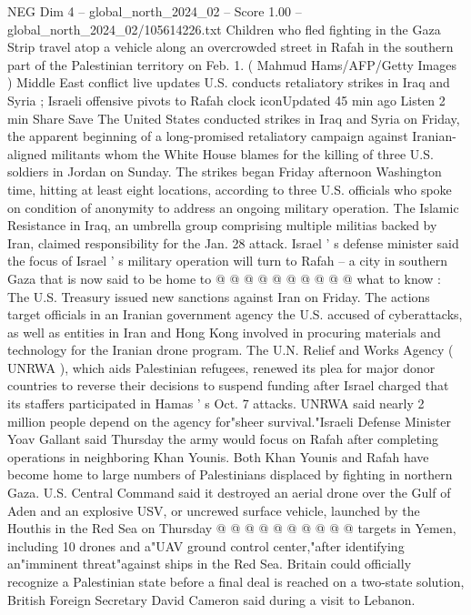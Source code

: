 \begin{textsample}{NEG Dim 4 – global\_north\_2024\_02 – Score 1.00 – global\_north\_2024\_02/105614226.txt}  \label{ex:f4_neg_290}
Children who fled fighting in the Gaza Strip travel atop a vehicle along an overcrowded street in Rafah in the southern part of the Palestinian territory on Feb. 1. ( Mahmud Hams/AFP/Getty Images ) Middle East conflict live updates U.S. conducts retaliatory strikes in Iraq and Syria ; Israeli offensive pivots to Rafah clock iconUpdated 45 min ago Listen 2 min Share Save The United States conducted strikes in Iraq and Syria on Friday, the apparent beginning of a long-promised retaliatory campaign against Iranian-aligned militants whom the White House blames for the killing of three U.S. soldiers in Jordan on Sunday.
The strikes began Friday afternoon Washington time, hitting at least eight locations, according to three U.S. officials who spoke on condition of anonymity to address an ongoing military operation.
The Islamic Resistance in Iraq, an umbrella group comprising multiple militias backed by Iran, claimed responsibility for the Jan. 28 attack.
Israel ' s defense minister said the focus of Israel ' s military operation will turn to Rafah -- a city in southern Gaza that is now said to be home to @ @ @ @ @ @ @ @ @ @ what to know : The U.S.
Treasury issued new sanctions against Iran on Friday.
The actions target officials in an Iranian government agency the U.S. accused of cyberattacks, as well as entities in Iran and Hong Kong involved in procuring materials and technology for the Iranian drone program.
The U.N.
Relief and Works Agency ( UNRWA ), which aids Palestinian refugees, renewed its plea for major donor countries to reverse their decisions to suspend funding after Israel charged that its staffers participated in Hamas ' s Oct. 7 attacks.
UNRWA said nearly 2 million people depend on the agency for"sheer survival."Israeli Defense Minister Yoav Gallant said Thursday the army would focus on Rafah after completing operations in neighboring Khan Younis.
Both Khan Younis and Rafah have become home to large numbers of Palestinians displaced by fighting in northern Gaza.
U.S.
Central Command said it destroyed an aerial drone over the Gulf of Aden and an explosive USV, or uncrewed surface vehicle, launched by the Houthis in the Red Sea on Thursday @ @ @ @ @ @ @ @ @ @ targets in Yemen, including 10 drones and a"UAV ground control center,"after identifying an"imminent threat"against ships in the Red Sea.
Britain could officially recognize a Palestinian state before a final deal is reached on a two-state solution, British Foreign Secretary David Cameron said during a visit to Lebanon.

\end{textsample}
